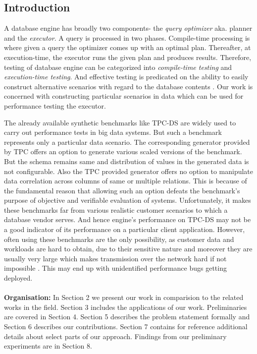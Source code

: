 \documentclass[]{article}
\begin{document}
	\begin{multicols}{2}
	\section{Introduction}
		A database engine has broadly two components- the \textit{query optimizer} aka. planner and the \textit{executor}.
		A query is processed in two phases. 
		Compile-time processing is where given a query the optimizer comes up with an optimal plan. 
		Thereafter, at execution-time, the executor runs the given plan and produces results.
		Therefore, testing of database engine can be categorized into \textit{compile-time testing} and \textit{execution-time testing}.
		And effective testing is predicated on the ability to easily construct alternative scenarios with regard to the database contents \cite{codd}. 
		Our work is concerned with constructing particular scenarios in data which can be used for performance testing the executor.  
		
		The already available synthetic benchmarks like TPC-DS \cite{tpcds} are widely used to carry out performance tests in big data systems. 
		But such a benchmark represents only a particular data scenario. 
		The corresponding generator provided by TPC offers an option to generate various scaled versions of the benchmark.
		But the schema remains same and distribution of values in the generated data is not configurable.
		Also the TPC provided generator offers no option to manipulate data correlation across columns of same or multiple relations. 
		This is because of the fundamental reason that allowing such an option defeats the benchmark's purpose of objective and verifiable evaluation of systems. 
		Unfortunately, it makes these benchmarks far from various realistic customer scenarios to which a database vendor serves. 
		And hence engine's performance on TPC-DS may not be a good indicator of its performance on a particular client application.
		However, often using these benchmarks are the only possibility, as customer data and workloads are hard to obtain, due to their sensitive nature and moreover they are usually very large which makes transmission over the network hard if not impossible \cite{rsgen}.
		This may end up with unidentified performance bugs getting deployed. 
		\\ \\
                \textbf{Organisation: } In Section 2 we present our work in comparision to the related works in the field. 
		Section 3 includes the applications of our work. 
		Preliminaries are covered in Section 4. 
		Section 5 describes the problem statement formally and Section 6 describes our contributions. 
		Section 7 contains for reference additional details about select parts of our approach. 
		Findings from our preliminary experiments are in Section 8. 


\end{multicols}
\end{document}
